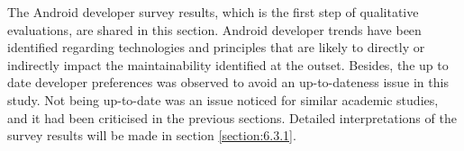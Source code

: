 The Android developer survey results, which is the first step of qualitative evaluations, are shared in this section. Android developer trends have been identified regarding technologies and principles that are likely to directly or indirectly impact the maintainability identified at the outset. Besides, the up to date developer preferences was observed to avoid an up-to-dateness issue in this study. Not being up-to-date was an issue noticed for similar academic studies, and it had been criticised in the previous sections. Detailed interpretations of the survey results will be made in section \ref{section:6.3.1}.